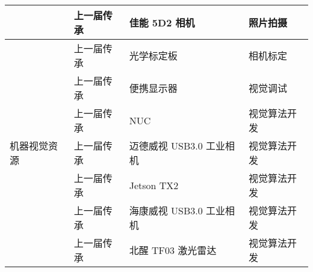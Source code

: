 \begin{longtable}{ X | X | X | X }
    \cline{2-4}

         &
        上一届传承 &
        佳能 5D2 相机 &
        照片拍摄 \\
    
    \hline
    
        \multirow{9}{*}{机器视觉资源} &
        上一届传承 &
        光学标定板 &
        相机标定\\
    
    \cline{2-4}

         &
        上一届传承 &
       便携显示器  &
       视觉调试 \\
    
    \cline{2-4}

        &
        上一届传承 &
        NUC &
        视觉算法开发\\
    
    \cline{2-4}

        &
        上一届传承 &
        迈德威视 USB3.0 工业相机 &
        视觉算法开发\\
    
    \cline{2-4}

        &
        上一届传承 &
        Jetson TX2 &
        视觉算法开发\\
    
    \cline{2-4}

        &
        上一届传承 &
        海康威视 USB3.0 工业相机 &
        视觉算法开发\\
    
    \cline{2-4}

        &
        上一届传承 &
        北醒 TF03 激光雷达 &
        视觉算法开发\\
    
    \hline
    
\end{longtable}
